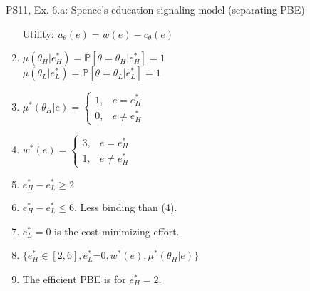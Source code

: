 \begin{frame}{PS11, Ex. 6.a: Spence’s education signaling model (separating PBE)}
\begin{multicols}{2}
\begin{enumerate}
        \item[Utility:] \vspace{-4pt}$u_\theta(e)=w(e)-c_\theta(e)$
        \item \vspace{-2pt}$\mu\left(\theta_H|e_H^*\right)=
               \mathbb{P}\left[\theta=\theta_H|e_H^*\right]=1$\\
              $\mu\left(\theta_L|e_L^*\right)=
               \mathbb{P}\left[\theta=\theta_L|e_L^*\right]=1$
        \item \vspace{-2pt}$\mu^*(\theta_H|e)=\left\{\begin{array}{ll}
                  1, & e = e_H^* \\
                  0, & e \neq e_H^*
               \end{array}\right.$
        \item \vspace{-2pt}$w^*(e)=\left\{\begin{array}{ll}
                  3, & e = e_H^* \\
                  1, & e \neq e_H^*
               \end{array}\right.$
        \item \vspace{-1pt}$e_H^*-e_L^*\geq2$
        \item \vspace{-1pt}$e_H^*-e_L^*\leq6$. Less binding than (4).
        \item \vspace{-1pt}$e_L^*=0$ is the cost-minimizing effort.
        \item \vspace{-1pt}$\{e_H^*\in[2,6],e_L^*$=$0,w^*(e),\mu^*(\theta_H|e)\}$
        \item \vspace{-1pt}The efficient PBE is for $e_H^*=2$.
      \end{enumerate}
    \end{multicols}
    \vfill\null
\end{frame}

